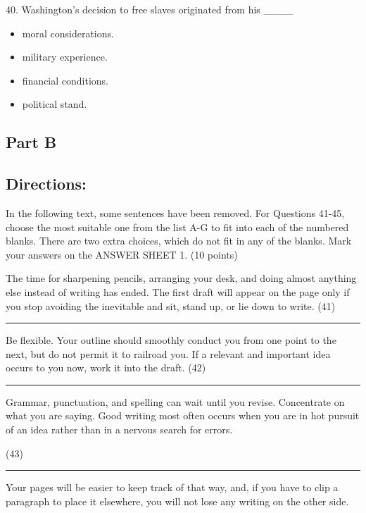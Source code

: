\documentclass[UTF8,11pt]{ctexart}
\begin{document}
40. Washington’s decision to free slaves originated from his \_\_\_\_


\begin{itemize}[leftmargin=2em,itemsep=.2em,topsep=.4em]\item[A.] moral considerations.
\item[B.] military experience.
\item[C.] financial conditions.
\item[D.] political stand.
\end{itemize}

\subsection*{\textbf{Part B}}


\subsection*{\textbf{Directions:}}


In the following text, some sentences have been removed. For Questions 41-45, choose the most suitable one from the list A-G to fit into each of the numbered blanks. There are two extra choices, which do not fit in any of the blanks. Mark your answers on the ANSWER SHEET 1. (10 points)


The time for sharpening pencils, arranging your desk, and doing almost anything else instead of writing has ended. The first draft will appear on the page only if you stop avoiding the inevitable and sit, stand up, or lie down to write. (41)\par\noindent\rule{.95\linewidth}{.4pt}\par


Be flexible. Your outline should smoothly conduct you from one point to the next, but do not permit it to railroad you. If a relevant and important idea occurs to you now, work it into the draft. (42)\par\noindent\rule{.95\linewidth}{.4pt}\par


Grammar, punctuation, and spelling can wait until you revise. Concentrate on what you are saying. Good writing most often occurs when you are in hot pursuit of an idea rather than in a nervous search for errors.


(43)\par\noindent\rule{.95\linewidth}{.4pt}\par  Your pages will be easier to keep track of that way, and, if you have to clip a paragraph to place it elsewhere, you will not lose any writing on the other side.
\end{document}
